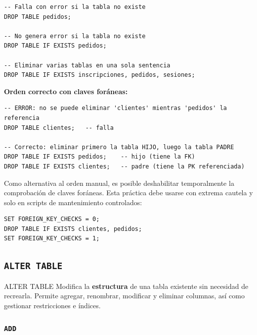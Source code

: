 \begin{lstlisting}[style=sql, caption={DROP TABLE básico y con guarda}]
-- Falla con error si la tabla no existe
DROP TABLE pedidos;

-- No genera error si la tabla no existe
DROP TABLE IF EXISTS pedidos;

-- Eliminar varias tablas en una sola sentencia
DROP TABLE IF EXISTS inscripciones, pedidos, sesiones;
\end{lstlisting}

\textbf{Orden correcto con claves foráneas:}

\begin{lstlisting}[style=sql, caption={DROP TABLE respetando integridad referencial}]
-- ERROR: no se puede eliminar 'clientes' mientras 'pedidos' la referencia
DROP TABLE clientes;   -- falla

-- Correcto: eliminar primero la tabla HIJO, luego la tabla PADRE
DROP TABLE IF EXISTS pedidos;    -- hijo (tiene la FK)
DROP TABLE IF EXISTS clientes;   -- padre (tiene la PK referenciada)
\end{lstlisting}

\begin{nota}
  Como alternativa al orden manual, es posible deshabilitar
  temporalmente la comprobación de claves foráneas. Esta práctica debe
  usarse con extrema cautela y solo en scripts de mantenimiento
  controlados:
\begin{lstlisting}[style=sql, caption={Deshabilitar FK solo para scripts de mantenimiento}]
SET FOREIGN_KEY_CHECKS = 0;
DROP TABLE IF EXISTS clientes, pedidos;
SET FOREIGN_KEY_CHECKS = 1;
\end{lstlisting}
\end{nota}

\subsection{\texttt{ALTER TABLE}}

\begin{definicion}{ALTER TABLE}
  Modifica la \textbf{estructura} de una tabla existente sin necesidad de
  recrearla. Permite agregar, renombrar, modificar y eliminar columnas, así
  como gestionar restricciones e índices.
\end{definicion}

\subsubsection{\texttt{ADD}}


